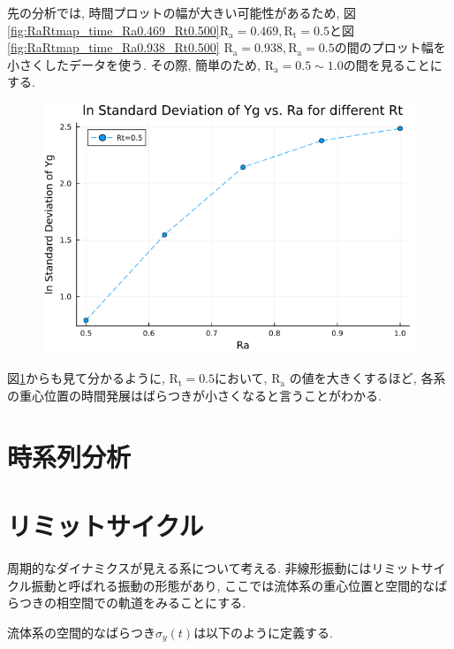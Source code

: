 先の分析では, 時間プロットの幅が大きい可能性があるため, 図\ref{fig:RaRtmap_time_Ra0.469_Rt0.500}$\text{R}_\text{a} = 0.469, \text{R}_\text{t} = 0.5$と図\ref{fig:RaRtmap_time_Ra0.938_Rt0.500} $\text{R}_\text{a} = 0.938, \text{R}_\text{a} = 0.5$の間のプロット幅を小さくしたデータを使う. その際, 簡単のため, $\text{R}_\text{a} =0.5 \sim 1.0$の間を見ることにする.



\begin{figure}[H]
  \centering
  \includegraphics[scale=0.5]{image/lnStdYg_Ra0.5to1.0_Rt0.5_ti25000.png}
  \caption{}
  \label{fig:lnStdYg_Ra0.5to1.0_Rt0.5_ti25000}
\end{figure}

図\ref{fig:lnStdYg_Ra0.5to1.0_Rt0.5_ti25000}からも見て分かるように, $\text{R}_\text{t} = 0.5$において, $\text{R}_\text{a}$ の値を大きくするほど, 各系の重心位置の時間発展はばらつきが小さくなると言うことがわかる.

\section{時系列分析}

\section{リミットサイクル}

周期的なダイナミクスが見える系について考える. 非線形振動にはリミットサイクル振動\cite{Rhythm}と呼ばれる振動の形態があり, ここでは流体系の重心位置と空間的なばらつきの相空間での軌道をみることにする.

流体系の空間的なばらつき$\sigma_{y} (t)$は以下のように定義する.

